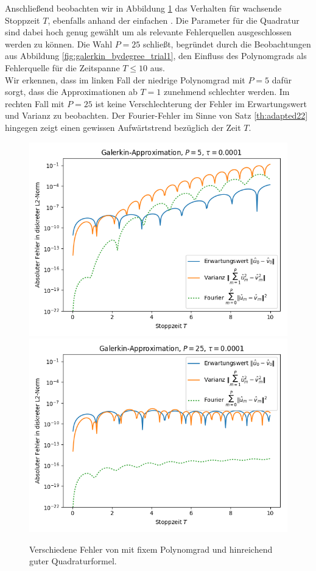 \newline
Anschließend beobachten wir in Abbildung \ref{fig:galerkin_bystoptime_trial1} das Verhalten für wachsende Stoppzeit $T$, ebenfalls anhand der einfachen . Die Parameter für die Quadratur sind dabei hoch genug gewählt um als relevante Fehlerquellen ausgeschlossen werden zu können. Die Wahl $P=25$ schließt, begründet durch die Beobachtungen aus Abbildung \ref{fig:galerkin_bydegree_trial1}, den Einfluss des Polynomgrads als Fehlerquelle für die Zeitspanne $T\le 10$ aus.\\
Wir erkennen, dass im linken Fall der niedrige Polynomgrad mit $P=5$ dafür sorgt, dass die Approximationen ab $T=1$ zunehmend schlechter werden. Im rechten Fall mit $P=25$ ist keine Verschlechterung der Fehler im Erwartungswert und Varianz zu beobachten. Der Fourier-Fehler im Sinne von Satz \ref{th:adapted22} hingegen zeigt einen gewissen Aufwärtstrend bezüglich der Zeit $T$.
\begin{figure}[!htb]
  \includegraphics[width=\linewidth]{Figures/galerkin_bystoptime_trial1_fixeddegree5.png}
\endminipage
{}
  \includegraphics[width=\linewidth]{Figures/galerkin_bystoptime_trial1_fixeddegree25.png}
\endminipage
  \caption{Verschiedene Fehler von  mit fixem Polynomgrad und hinreichend guter Quadraturformel.}
  \label{fig:galerkin_bystoptime_trial1}
\end{figure}

